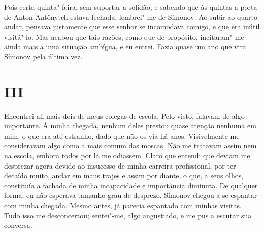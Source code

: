 Pois certa quinta"-feira, sem suportar a solidão, e sabendo que às
quintas a porta de Anton Antônytch estava fechada, lembrei"-me de
Símonov. Ao subir ao quarto andar, pensava justamente que esse senhor se
incomodava comigo, e que era inútil visitá"-lo. Mas acabou que tais
razões, como que de propósito, incitaram"-me ainda mais a uma situação
ambígua, e eu entrei. Fazia quase um ano que vira Símonov pela última
vez.

\section{III}

Encontrei ali mais dois de meus colegas de escola. Pelo visto, falavam
de algo importante. À minha chegada, nenhum deles prestou quase atenção
nenhuma em mim, o que era até estranho, dado que não os via há anos.
Visivelmente me consideravam algo como a mais comum das moscas. Não me
tratavam assim nem na escola, embora todos por lá me odiassem. Claro que
entendi que deviam me desprezar agora devido ao insucesso de minha
carreira profissional, por ter decaído muito, andar em maus trajes e
assim por diante, o que, a seus olhos, constituía a fachada de minha
incapacidade e importância diminuta. De qualquer forma, eu não esperava
tamanho grau de desprezo. Símonov chegou a se espantar com minha
chegada. Mesmo antes, já parecia espantado com minhas visitas. Tudo isso
me desconcertou; sentei"-me, algo angustiado, e me pus a escutar sua
conversa.

